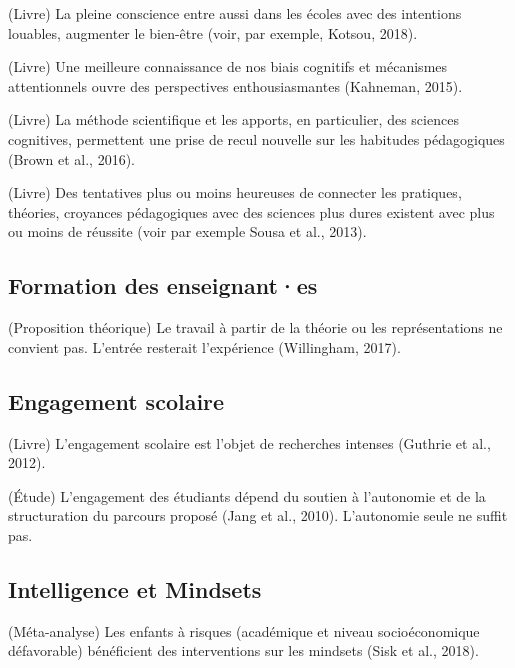 \documentclass[
  french,
]{article}
\begin{document}
(Livre) La pleine conscience entre aussi dans les écoles avec des intentions louables, augmenter le bien-être (voir, par exemple, Kotsou, 2018).

(Livre) Une meilleure connaissance de nos biais cognitifs et mécanismes attentionnels ouvre des perspectives enthousiasmantes (Kahneman, 2015).

(Livre) La méthode scientifique et les apports, en particulier, des sciences cognitives, permettent une prise de recul nouvelle sur les habitudes pédagogiques (Brown et al., 2016).

(Livre) Des tentatives plus ou moins heureuses de connecter les pratiques, théories, croyances pédagogiques avec des sciences plus dures existent avec plus ou moins de réussite (voir par exemple Sousa et al., 2013).

\hypertarget{formation-des-enseignantes}{%
\subsection{Formation des enseignant·es}\label{formation-des-enseignantes}}

(Proposition théorique) Le travail à partir de la théorie ou les représentations ne convient pas. L'entrée resterait l'expérience (Willingham, 2017).

\hypertarget{engagement-scolaire}{%
\subsection{Engagement scolaire}\label{engagement-scolaire}}

(Livre) L'engagement scolaire est l'objet de recherches intenses (Guthrie et al., 2012).

(Étude) L'engagement des étudiants dépend du soutien à l'autonomie et de la structuration du parcours proposé (Jang et al., 2010). L'autonomie seule ne suffit pas.

\hypertarget{intelligence-et-mindsets}{%
\subsection{Intelligence et Mindsets}\label{intelligence-et-mindsets}}

(Méta-analyse) Les enfants à risques (académique et niveau socioéconomique défavorable) bénéficient des interventions sur les mindsets (Sisk et al., 2018).
\end{document}
